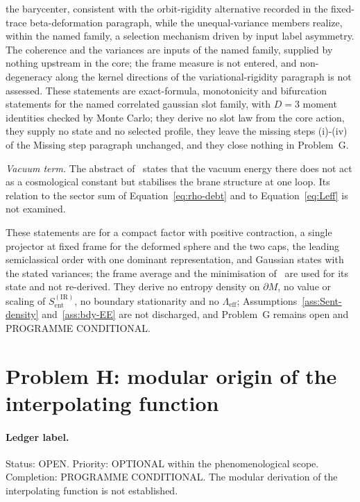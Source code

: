 the barycenter, consistent with the orbit-rigidity alternative recorded in the fixed-trace beta-deformation paragraph, while the unequal-variance members realize, within the named family, a selection mechanism driven by input label asymmetry. The coherence and the variances are inputs of the named family, supplied by nothing upstream in the core; the frame measure is not entered, and non-degeneracy along the kernel directions of the variational-rigidity paragraph is not assessed. These statements are exact-formula, monotonicity and bifurcation statements for the named correlated gaussian slot family, with \(D=3\) moment identities checked by Monte Carlo; they derive no slot law from the core action, they supply no state and no selected profile, they leave the missing steps (i)-(iv) of the Missing step paragraph unchanged, and they close nothing in Problem~G.

\emph{Vacuum term.} The abstract of~\cite{Steinacker2023} states that the vacuum energy there does not act as a cosmological constant but stabilises the brane structure at one loop. Its relation to the sector sum of Equation~\eqref{eq:rho-debt} and to Equation~\eqref{eq:Leff} is not examined.

These statements are for a compact factor with positive contraction, a single projector at fixed frame for the deformed sphere and the two caps, the leading semiclassical order with one dominant representation, and Gaussian states with the stated variances; the frame average and the minimisation of~\cite{FlissFrenkelHartnollSoni2025} are used for its state and not re-derived. They derive no entropy density on \(\partial M\), no value or scaling of \(S_{\mathrm{ent}}^{\mathrm{(IR)}}\), no boundary stationarity and no \(\Lambda_{\mathrm{eff}}\); Assumptions~\ref{ass:Sent-density} and~\ref{ass:bdy-EE} are not discharged, and Problem~G remains open and PROGRAMME CONDITIONAL.

\section{Problem H: modular origin of the interpolating function}
\label{sec:status-H}

\paragraph{Ledger label.}
Status: OPEN. Priority: OPTIONAL within the phenomenological scope.
Completion: PROGRAMME CONDITIONAL. The modular derivation of the
interpolating function is not established.

